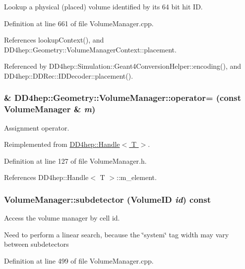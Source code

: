 Lookup a physical (placed) volume identified by its 64 bit hit ID. 

Definition at line 661 of file VolumeManager.cpp.

References lookupContext(), and DD4hep::Geometry::VolumeManagerContext::placement.

Referenced by DD4hep::Simulation::Geant4ConversionHelper::encoding(), and DD4hep::DDRec::IDDecoder::placement().\hypertarget{class_d_d4hep_1_1_geometry_1_1_volume_manager_ad81abecb3dd9f512683df8e41d84f2c9}{
\subsubsection[{operator=}]{\& DD4hep::Geometry::VolumeManager::operator= (const {\bf VolumeManager} \& {\em m})}}
\label{class_d_d4hep_1_1_geometry_1_1_volume_manager_ad81abecb3dd9f512683df8e41d84f2c9}


Assignment operator. 

Reimplemented from \hyperlink{class_d_d4hep_1_1_handle_a9bbf8f498df42e81ad26fb00233505a6}{DD4hep::Handle$<$ T $>$}.

Definition at line 127 of file VolumeManager.h.

References DD4hep::Handle$<$ T $>$::m\_\-element.\hypertarget{class_d_d4hep_1_1_geometry_1_1_volume_manager_aea4b44d4815c7fe573151d009082422b}{
\subsubsection[{subdetector}]{ VolumeManager::subdetector ({\bf VolumeID} {\em id}) const}}
\label{class_d_d4hep_1_1_geometry_1_1_volume_manager_aea4b44d4815c7fe573151d009082422b}


Access the volume manager by cell id. 

Need to perform a linear search, because the \char`\"{}system\char`\"{} tag width may vary between subdetectors 

Definition at line 499 of file VolumeManager.cpp.

